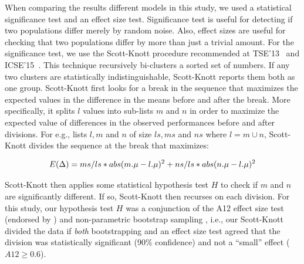 \documentclass[10pt,journal,compsoc]{IEEEtran}
\begin{document}
When comparing the results different models in this study, we used a statistical significance test and an effect size test. Significance test is useful for detecting if two populations
differ merely by random noise. Also, effect sizes are useful for checking that two populations differ by more than just a trivial amount. For the significance test,  we use the Scott-Knott procedure  recommended at TSE'13~\cite{mittas2013ranking} and ICSE'15~\cite{ghotra2015revisiting}. This technique recursively bi-clusters a sorted set of numbers. If any two clusters are statistically indistinguishable, Scott-Knott reports them both as one group. Scott-Knott first looks for a break in the sequence that maximizes the expected values in the difference in the means before and after the break. More specifically,  it  splits $l$ values into sub-lists $m$ and $n$ in order to maximize the expected value of differences  in the observed performances before and after divisions. For e.g., lists $l,m$ and $n$ of size $ls,ms$ and $ns$ where $l=m\cup n$, Scott-Knott divides the sequence at the break that maximizes:

\begin{equation}
    E(\Delta)=ms/ls*abs(m.\mu - l.\mu)^2 \\ + ns/ls*abs(n.\mu - l.\mu)^2
\end{equation}

Scott-Knott then applies some statistical hypothesis test $H$ to check if $m$ and $n$ are significantly different. If so, Scott-Knott then recurses on each division. For this study, our hypothesis test $H$ was a conjunction of the A12 effect size test (endorsed by \cite{arcuri2011practical})  and non-parametric bootstrap sampling \cite{efron94}, i.e., our Scott-Knott divided the data if {\em both} bootstrapping and an effect size test agreed that the division was statistically significant (90\% confidence) and not a ``small'' effect ($A12 \ge 0.6$).
\end{document}
